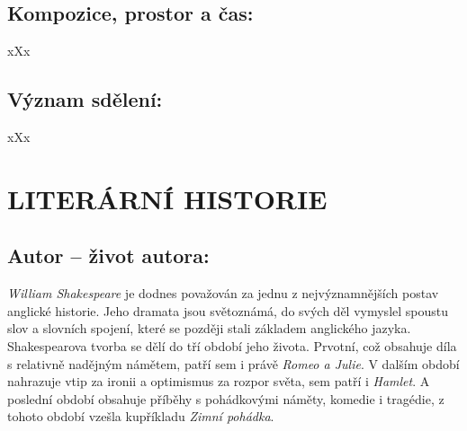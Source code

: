 \documentclass{extarticle} %
\begin{document}
\subsection*{Kompozice, prostor a čas:}
\noindent 
xXx

\subsection*{Význam sdělení:}
\noindent 
xXx

\section*{LITERÁRNÍ HISTORIE}





\subsection*{Autor {\ssmall -- život autora:}}
\noindent 
\textit{William Shakespeare} je dodnes považován za jednu z nejvýznamnějších postav anglické historie.
Jeho dramata jsou světoznámá, do svých děl vymyslel spoustu slov a slovních spojení, které se později stali základem anglického jazyka. \\
Shakespearova tvorba se dělí do tří období jeho života.
Prvotní, což obsahuje díla s relativně nadějným námětem, patří sem i právě \textit{Romeo a Julie}.
V dalším období nahrazuje vtip za ironii a optimismus za rozpor světa, sem patří i \textit{Hamlet}.
A poslední období obsahuje příběhy s pohádkovými náměty, komedie i tragédie, z tohoto období vzešla kupříkladu \textit{Zimní pohádka}.
\end{document}

